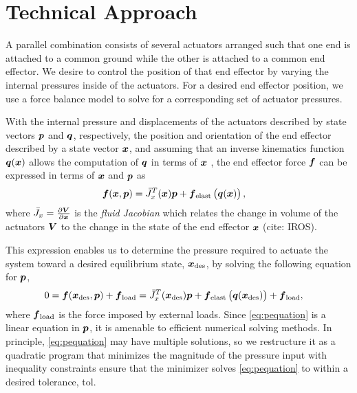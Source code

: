 \section{Technical Approach}    \label{sec:technical-approach}

A parallel combination consists of several actuators arranged such that one end is attached to a common ground while the other is attached to a common end effector. We desire to control the position of that end effector by varying the internal pressures inside of the actuators. For a desired end effector position, we use a force balance model to solve for a corresponding set of actuator pressures.

With the internal pressure and displacements of the actuators described by state vectors $\p$ and $\q$, respectively, the position and orientation of the end effector described by a state vector $\x$, and assuming that an inverse kinematics function $\q(\x)$ allows the computation of  $\q$ in terms of $\x$ , the end effector force $\f$ can be expressed in terms of $\x$ and $\p$ as 
\begin{align}
    \f (\x, \p) &= \J_x^T (\x) \p + \f_{\tx{elast}} \left( \q(\x) \right),
\end{align}
where $\J_x = \frac{\partial \vec{V}}{\partial \x}$ is the \emph{fluid Jacobian} which relates the change in volume of the actuators $\V$ to the change in the state of the end effector $\x$ (cite: IROS).

This expression enables us to determine the pressure required to actuate the system toward a desired equilibrium state, $\x_\tx{des}$, by solving the following equation for $\p$,
\begin{align}
    0 &= \f (\x_{\tx{des}}, \p) + \f_\tx{load} =  \J_x^T (\x_\tx{des}) \p + \f_{\tx{elast}} \left( \q(\x_\tx{des}) \right) + \f_\tx{load} , 
    \label{eq:pequation}
\end{align}
where $\f_\tx{load}$ is the force imposed by external loads.
Since \eqref{eq:pequation} is a linear equation in $\p$, it is amenable to efficient numerical solving methods. In principle, \eqref{eq:pequation} may have multiple solutions, so we restructure it as a quadratic program that minimizes the magnitude of the pressure input with inequality constraints ensure that the minimizer solves \eqref{eq:pequation} to within a desired tolerance, tol.

